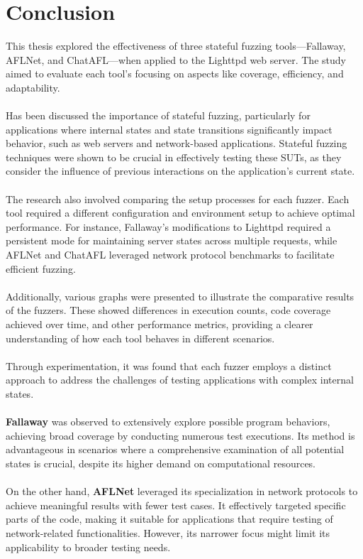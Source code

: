 \chapter{Conclusion} 
This thesis explored the effectiveness of three stateful fuzzing tools—Fallaway, AFLNet, and ChatAFL—when applied to the Lighttpd web server. The study aimed to evaluate each tool's focusing on aspects like coverage, efficiency, and adaptability.
\\\\Has been discussed the importance of stateful fuzzing, particularly for applications where internal states and state transitions significantly impact behavior, such as web servers and network-based applications. Stateful fuzzing techniques were shown to be crucial in effectively testing these SUTs, as they consider the influence of previous interactions on the application's current state.
\\\\The research also involved comparing the setup processes for each fuzzer. Each tool required a different configuration and environment setup to achieve optimal performance. For instance, Fallaway's modifications to Lighttpd required a persistent mode for maintaining server states across multiple requests, while AFLNet and ChatAFL leveraged network protocol benchmarks to facilitate efficient fuzzing.
\\\\Additionally, various graphs were presented to illustrate the comparative results of the fuzzers. These showed differences in execution counts, code coverage achieved over time, and other performance metrics, providing a clearer understanding of how each tool behaves in different scenarios.
\\\\Through experimentation, it was found that each fuzzer employs a distinct approach to address the challenges of testing applications with complex internal states. 
\\\\\textbf{Fallaway} was observed to extensively explore possible program behaviors, achieving broad coverage by conducting numerous test executions. Its method is advantageous in scenarios where a comprehensive examination of all potential states is crucial, despite its higher demand on computational resources.
\\\\On the other hand, \textbf{AFLNet} leveraged its specialization in network protocols to achieve meaningful results with fewer test cases. It effectively targeted specific parts of the code, making it suitable for applications that require testing of network-related functionalities. However, its narrower focus might limit its applicability to broader testing needs.
